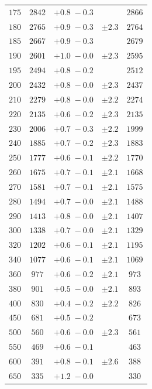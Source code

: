\begin{table}
\begin{tabular}{ccccc}
$175 $&$ 2842  $&$ +0.8 \; -\!0.3 $&$          $&$ 2866  $ \\
$180 $&$ 2765  $&$ +0.9 \; -\!0.3 $&$ \pm 2.3  $&$ 2764  $ \\
$185 $&$ 2667  $&$ +0.9 \; -\!0.3 $&$          $&$ 2679  $ \\
$190 $&$ 2601  $&$ +1.0 \; -\!0.0 $&$ \pm 2.3  $&$ 2595  $ \\
$195 $&$ 2494  $&$ +0.8 \; -\!0.2 $&$          $&$ 2512  $ \\
$200 $&$ 2432  $&$ +0.8 \; -\!0.0 $&$ \pm 2.3  $&$ 2437  $ \\
$210 $&$ 2279  $&$ +0.8 \; -\!0.0 $&$ \pm 2.2  $&$ 2274  $ \\
$220 $&$ 2135  $&$ +0.6 \; -\!0.2 $&$ \pm 2.3  $&$ 2135  $ \\
$230 $&$ 2006  $&$ +0.7 \; -\!0.3 $&$ \pm 2.2  $&$ 1999  $ \\
$240 $&$ 1885  $&$ +0.7 \; -\!0.2 $&$ \pm 2.3  $&$ 1883  $ \\
$250 $&$ 1777  $&$ +0.6 \; -\!0.1 $&$ \pm 2.2  $&$ 1770  $ \\
$260 $&$ 1675  $&$ +0.7 \; -\!0.1 $&$ \pm 2.1  $&$ 1668  $ \\
$270 $&$ 1581  $&$ +0.7 \; -\!0.1 $&$ \pm 2.1  $&$ 1575  $ \\
$280 $&$ 1494  $&$ +0.7 \; -\!0.0 $&$ \pm 2.1  $&$ 1488  $ \\
$290 $&$ 1413  $&$ +0.8 \; -\!0.0 $&$ \pm 2.1  $&$ 1407  $ \\
$300 $&$ 1338  $&$ +0.7 \; -\!0.0 $&$ \pm 2.1  $&$ 1329  $ \\
$320 $&$ 1202  $&$ +0.6 \; -\!0.1 $&$ \pm 2.1  $&$ 1195  $ \\
$340 $&$ 1077  $&$ +0.6 \; -\!0.1 $&$ \pm 2.1  $&$ 1069  $ \\
$360 $&$  977  $&$ +0.6 \; -\!0.2 $&$ \pm 2.1  $&$  973  $ \\
$380 $&$  901  $&$ +0.5 \; -\!0.0 $&$ \pm 2.1  $&$  893  $ \\
$400 $&$  830  $&$ +0.4 \; -\!0.2 $&$ \pm 2.2  $&$  826  $ \\
$450 $&$  681  $&$ +0.5 \; -\!0.2 $&$          $&$  673  $ \\
$500 $&$  560  $&$ +0.6 \; -\!0.0 $&$ \pm 2.3  $&$  561  $ \\
$550 $&$  469  $&$ +0.6 \; -\!0.1 $&$          $&$  463  $ \\
$600 $&$  391  $&$ +0.8 \; -\!0.1 $&$ \pm 2.6  $&$  388  $ \\
$650 $&$  335  $&$ +1.2 \; -\!0.0 $&$          $&$  330  $ \\

\end{tabular}
\end{table}

